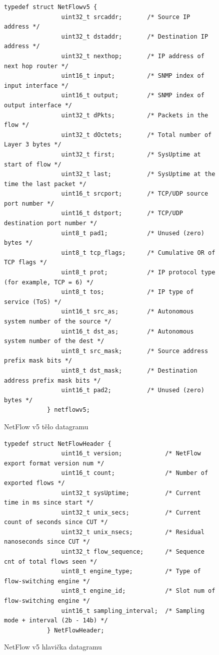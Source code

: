 \documentclass[11pt, a4paper, hidelinks]{article}[08.10.2023]
\begin{document}
    \begin{figure}[h!]
        \centering
        \begin{lstlisting}[style=CStyle]
            typedef struct NetFlowv5 {
                uint32_t srcaddr;       /* Source IP address */
                uint32_t dstaddr;       /* Destination IP address */
                uint32_t nexthop;       /* IP address of next hop router */
                uint16_t input;         /* SNMP index of input interface */
                uint16_t output;        /* SNMP index of output interface */
                uint32_t dPkts;         /* Packets in the flow */
                uint32_t dOctets;       /* Total number of Layer 3 bytes */
                uint32_t first;         /* SysUptime at start of flow */
                uint32_t last;          /* SysUptime at the time the last packet */
                uint16_t srcport;       /* TCP/UDP source port number */
                uint16_t dstport;       /* TCP/UDP destination port number */
                uint8_t pad1;           /* Unused (zero) bytes */
                uint8_t tcp_flags;      /* Cumulative OR of TCP flags */
                uint8_t prot;           /* IP protocol type (for example, TCP = 6) */
                uint8_t tos;            /* IP type of service (ToS) */
                uint16_t src_as;        /* Autonomous system number of the source */
                uint16_t dst_as;        /* Autonomous system number of the dest */
                uint8_t src_mask;       /* Source address prefix mask bits */
                uint8_t dst_mask;       /* Destination address prefix mask bits */
                uint16_t pad2;          /* Unused (zero) bytes */
            } netflowv5;
        \end{lstlisting}
        \caption{NetFlow v5 tělo datagramu}
        \label{netflowstruct}
    \end{figure}

    \begin{figure}[h!]
        \centering
        \begin{lstlisting}[style=CStyle]
            typedef struct NetFlowHeader {
                uint16_t version;            /* NetFlow export format version num */
                uint16_t count;              /* Number of exported flows */
                uint32_t sysUptime;          /* Current time in ms since start */
                uint32_t unix_secs;          /* Current count of seconds since CUT */
                uint32_t unix_nsecs;         /* Residual nanoseconds since CUT */
                uint32_t flow_sequence;      /* Sequence cnt of total flows seen */
                uint8_t engine_type;         /* Type of flow-switching engine */
                uint8_t engine_id;           /* Slot num of flow-switching engine */
                uint16_t sampling_interval;  /* Sampling mode + interval (2b - 14b) */
            } NetFlowHeader;
        \end{lstlisting}
        \caption{NetFlow v5 hlavička datagramu}
        \label{netflowhdr}
    \end{figure}
\end{document}
